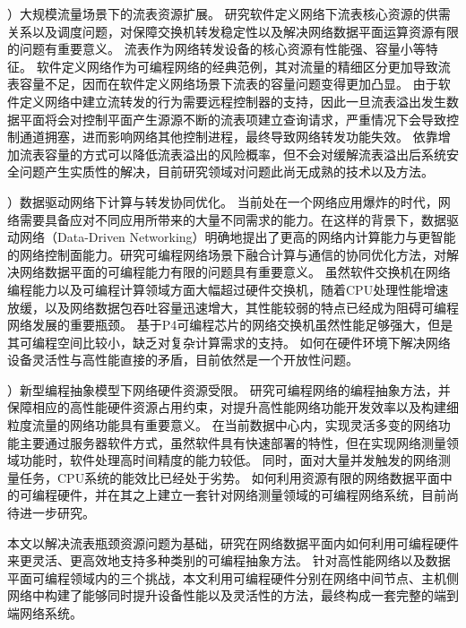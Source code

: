 {）大规模流量场景下的流表资源扩展。}
研究软件定义网络下流表核心资源的供需关系以及调度问题，对保障交换机转发稳定性以及解决网络数据平面运算资源有限的问题有重要意义。
流表作为网络转发设备的核心资源有性能强、容量小等特征。
软件定义网络作为可编程网络的经典范例，其对流量的精细区分更加导致流表容量不足，因而在软件定义网络场景下流表的容量问题变得更加凸显。
由于软件定义网络中建立流转发的行为需要远程控制器的支持，因此一旦流表溢出发生数据平面将会对控制平面产生源源不断的流表项建立查询请求，严重情况下会导致控制通道拥塞，进而影响网络其他控制进程，最终导致网络转发功能失效。
依靠增加流表容量的方式可以降低流表溢出的风险概率，但不会对缓解流表溢出后系统安全问题产生实质性的解决，目前研究领域对问题此尚无成熟的技术以及方法。

{）数据驱动网络下计算与转发协同优化。}
当前处在一个网络应用爆炸的时代，网络需要具备应对不同应用所带来的大量不同需求的能力。在这样的背景下，数据驱动网络（Data-Driven Networking）明确地提出了更高的网络内计算能力与更智能的网络控制面能力。研究可编程网络场景下融合计算与通信的协同优化方法，对解决网络数据平面的可编程能力有限的问题具有重要意义。
虽然软件交换机在网络编程能力以及可编程计算领域方面大幅超过硬件交换机，随着CPU处理性能增速放缓，以及网络数据包吞吐容量迅速增大，其性能较弱的特点已经成为阻碍可编程网络发展的重要瓶颈。
基于P4可编程芯片的网络交换机虽然性能足够强大，但是其可编程空间比较小，缺乏对复杂计算需求的支持。
如何在硬件环境下解决网络设备灵活性与高性能直接的矛盾，目前依然是一个开放性问题。

{）新型编程抽象模型下网络硬件资源受限。}
研究可编程网络的编程抽象方法，并保障相应的高性能硬件资源占用约束，对提升高性能网络功能开发效率以及构建细粒度流量的网络功能具有重要意义。
在当前数据中心内，实现灵活多变的网络功能主要通过服务器软件方式，虽然软件具有快速部署的特性，但在实现网络测量领域功能时，软件处理高时间精度的能力较低。
同时，面对大量并发触发的网络测量任务，CPU系统的能效比已经处于劣势。
如何利用资源有限的网络数据平面中的可编程硬件，并在其之上建立一套针对网络测量领域的可编程网络系统，目前尚待进一步研究。

\label{chap132}
本文以解决流表瓶颈资源问题为基础，研究在网络数据平面内如何利用可编程硬件来更灵活、更高效地支持多种类别的可编程抽象方法。
针对高性能网络以及数据平面可编程领域内的三个挑战，本文利用可编程硬件分别在网络中间节点、主机侧网络中构建了能够同时提升设备性能以及灵活性的方法，最终构成一套完整的端到端网络系统。

